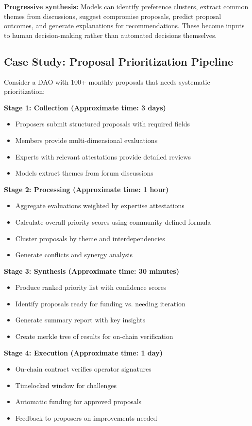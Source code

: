 \textbf{Progressive synthesis:} Models can identify preference clusters, extract common themes from discussions, suggest compromise proposals, predict proposal outcomes, and generate explanations for recommendations. These become inputs to human decision-making rather than automated decisions themselves.

\subsection{Case Study: Proposal Prioritization Pipeline}

Consider a DAO with 100+ monthly proposals that needs systematic prioritization:

\textbf{Stage 1: Collection (Approximate time: 3 days)}
\begin{itemize}
\item Proposers submit structured proposals with required fields
\item Members provide multi-dimensional evaluations
\item Experts with relevant attestations provide detailed reviews
\item Models extract themes from forum discussions
\end{itemize}

\textbf{Stage 2: Processing (Approximate time: 1 hour)}
\begin{itemize}
\item Aggregate evaluations weighted by expertise attestations
\item Calculate overall priority scores using community-defined formula
\item Cluster proposals by theme and interdependencies
\item Generate conflicts and synergy analysis
\end{itemize}

\textbf{Stage 3: Synthesis (Approximate time: 30 minutes)}
\begin{itemize}
\item Produce ranked priority list with confidence scores
\item Identify proposals ready for funding vs. needing iteration
\item Generate summary report with key insights
\item Create merkle tree of results for on-chain verification
\end{itemize}

\textbf{Stage 4: Execution (Approximate time: 1 day)}
\begin{itemize}
\item On-chain contract verifies operator signatures
\item Timelocked window for challenges
\item Automatic funding for approved proposals
\item Feedback to proposers on improvements needed
\end{itemize}

